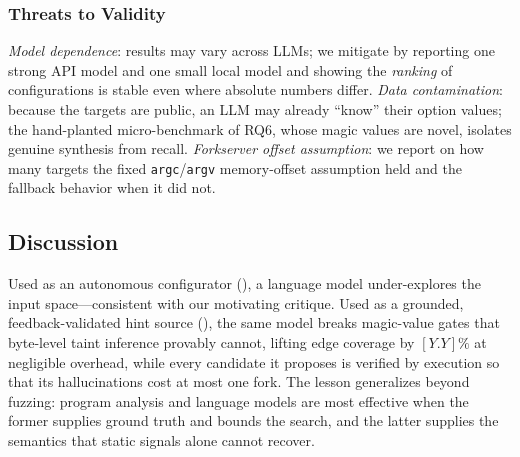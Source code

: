 \subsubsection{Threats to Validity}
\emph{Model dependence}: results may vary across LLMs; we mitigate by reporting one strong API model and one small local model and showing the \emph{ranking} of configurations is stable even where absolute numbers differ. \emph{Data contamination}: because the targets are public, an LLM may already ``know'' their option values; the hand-planted micro-benchmark of RQ6, whose magic values are novel, isolates genuine synthesis from recall. \emph{Forkserver offset assumption}: we report on how many targets the fixed \texttt{argc}/\texttt{argv} memory-offset assumption held and the fallback behavior when it did not.

\subsection{Discussion}
Used as an autonomous configurator (\LLMonly{}), a language model under-explores the input space---consistent with our motivating critique. Used as a grounded, feedback-validated hint source (\KSHS{}), the same model breaks magic-value gates that byte-level taint inference provably cannot, lifting edge coverage by $[Y.Y]\%$ at negligible overhead, while every candidate it proposes is verified by execution so that its hallucinations cost at most one fork. The lesson generalizes beyond fuzzing: program analysis and language models are most effective when the former supplies ground truth and bounds the search, and the latter supplies the semantics that static signals alone cannot recover.
